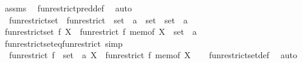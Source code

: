 \begin{isabellebody}
\isamarkupfalse%
\ assms\ \isamarkupfalse%
\ fun{\isacharunderscore}{\kern0pt}restrict{\isacharunderscore}{\kern0pt}pred{\isacharunderscore}{\kern0pt}def\ \isamarkupfalse%
\ auto%
\endisatagproof
{\isafoldproof}%
%
\isadelimproof
\isanewline
%
\endisadelimproof
\isanewline
{}\isamarkupfalse%
\isanewline
\isanewline
{}\isamarkupfalse%
\isanewline
\ \ fun{\isacharunderscore}{\kern0pt}restrict{\isacharunderscore}{\kern0pt}set\ {\isasymequiv}\ {\isachardoublequoteopen}fun{\isacharunderscore}{\kern0pt}restrict\ {\isacharcolon}{\kern0pt}{\isacharcolon}{\kern0pt}\ {\isacharparenleft}{\kern0pt}set\ {\isasymRightarrow}\ {\isacharprime}{\kern0pt}a{\isacharparenright}{\kern0pt}\ {\isasymRightarrow}\ set\ {\isasymRightarrow}\ set\ {\isasymRightarrow}\ {\isacharprime}{\kern0pt}a{\isachardoublequoteclose}\isanewline
{}\isanewline
\ \ \isamarkupfalse%
\ {\isachardoublequoteopen}fun{\isacharunderscore}{\kern0pt}restrict{\isacharunderscore}{\kern0pt}set\ f\ X\ {\isasymequiv}\ fun{\isacharunderscore}{\kern0pt}restrict\ f\ {\isacharparenleft}{\kern0pt}mem{\isacharunderscore}{\kern0pt}of\ X{\isacharparenright}{\kern0pt}\ {\isacharcolon}{\kern0pt}{\isacharcolon}{\kern0pt}\ set\ {\isasymRightarrow}\ {\isacharprime}{\kern0pt}a{\isachardoublequoteclose}\isanewline
{}\isamarkupfalse%
\isanewline
\isanewline
{}\isamarkupfalse%
\ fun{\isacharunderscore}{\kern0pt}restrict{\isacharunderscore}{\kern0pt}set{\isacharunderscore}{\kern0pt}eq{\isacharunderscore}{\kern0pt}fun{\isacharunderscore}{\kern0pt}restrict\ {\isacharbrackleft}{\kern0pt}simp{\isacharbrackright}{\kern0pt}{\isacharcolon}{\kern0pt}\isanewline
\ \ {\isachardoublequoteopen}fun{\isacharunderscore}{\kern0pt}restrict\ {\isacharparenleft}{\kern0pt}f\ {\isacharcolon}{\kern0pt}{\isacharcolon}{\kern0pt}\ set\ {\isasymRightarrow}\ {\isacharprime}{\kern0pt}a{\isacharparenright}{\kern0pt}\ X\ {\isacharequal}{\kern0pt}\ fun{\isacharunderscore}{\kern0pt}restrict\ f\ {\isacharparenleft}{\kern0pt}mem{\isacharunderscore}{\kern0pt}of\ X{\isacharparenright}{\kern0pt}{\isachardoublequoteclose}\isanewline
%
\isadelimproof
\ \ %
\endisadelimproof
%
\isatagproof
{}\isamarkupfalse%
\ fun{\isacharunderscore}{\kern0pt}restrict{\isacharunderscore}{\kern0pt}set{\isacharunderscore}{\kern0pt}def\ \isamarkupfalse%
\ auto%
\endisatagproof
{\isafoldproof}%
%
\isadelimproof
\isanewline
%
\endisadelimproof
\isanewline
%
\isadelimtheory
\isanewline
%
\endisadelimtheory
%
\isatagtheory
{}\isamarkupfalse%
%
\endisatagtheory
{\isafoldtheory}%
%
\isadelimtheory
%
\endisadelimtheory
%
\end{isabellebody}%
